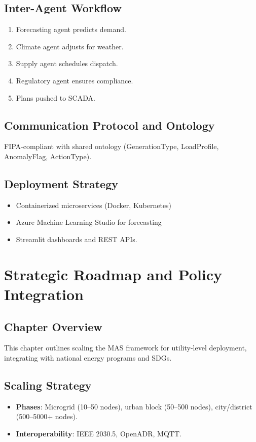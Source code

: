 \documentclass[12pt, a4paper, oneside]{book}
\begin{document}
\section{Inter-Agent Workflow}
\begin{enumerate}
    \item Forecasting agent predicts demand.
    \item Climate agent adjusts for weather.
    \item Supply agent schedules dispatch.
    \item Regulatory agent ensures compliance.
    \item Plans pushed to SCADA.
\end{enumerate}

\section{Communication Protocol and Ontology}
FIPA-compliant with shared ontology (GenerationType, LoadProfile, AnomalyFlag, ActionType).

\section{Deployment Strategy}
\begin{itemize}
    \item Containerized microservices (Docker, Kubernetes)
    \item Azure Machine Learning Studio for forecasting
    \item Streamlit dashboards and REST APIs.
\end{itemize}

\chapter{Strategic Roadmap and Policy Integration}
\section{Chapter Overview}
This chapter outlines scaling the MAS framework for utility-level deployment, integrating with national energy programs and SDGs.

\section{Scaling Strategy}
\begin{itemize}
    \item \textbf{Phases}: Microgrid (10–50 nodes), urban block (50–500 nodes), city/district (500–5000+ nodes).
    \item \textbf{Interoperability}: IEEE 2030.5, OpenADR, MQTT.
\end{itemize}
\end{document}
